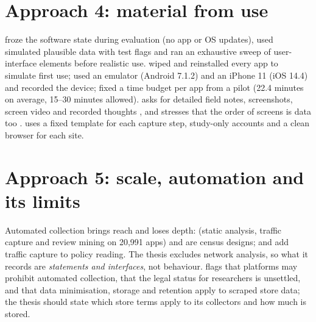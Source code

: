 \section{Approach 4: material from use}
 froze the software state during evaluation (no app or OS updates), used simulated plausible data with test flags and ran an exhaustive sweep of user-interface elements before realistic use.  wiped and reinstalled every app to simulate first use;  used an emulator (Android 7.1.2) and an iPhone 11 (iOS 14.4) and recorded the device;  fixed a time budget per app from a pilot (22.4 minutes on average, 15--30 minutes allowed).  asks for detailed field notes, screenshots, screen video and recorded thoughts , and stresses that the order of screens is data too .  uses a fixed template for each capture step, study-only accounts and a clean browser for each site.

\section{Approach 5: scale, automation and its limits}
Automated collection brings reach and loses depth:  (static analysis, traffic capture and review mining on 20{,}991 apps) and  are census designs;  and  add traffic capture to policy reading. The thesis excludes network analysis, so what it records are \emph{statements and interfaces}, not behaviour.  flags that platforms may prohibit automated collection, that the legal status for researchers is unsettled, and that data minimisation, storage and retention apply to scraped store data; the thesis should state which store terms apply to its collectors and how much is stored.

